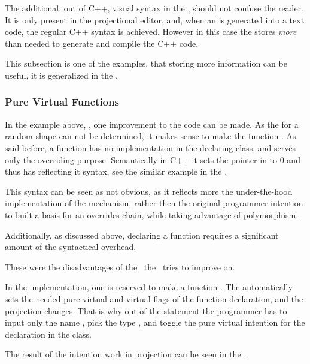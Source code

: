 
The additional, out of C++, visual syntax in the \pcpp, should not confuse the reader. It is only 
present in the projectional editor, and, when an  is generated into a text code, the regular
C++ syntax is achieved. However in this case the  stores \emph{more} than needed to 
generate and compile the C++ code. 

This subsection is one of the examples, that storing more information can be useful,
it is generalized in the .


\subsubsection{Pure Virtual Functions}
\label{purevirtualfuncs}

In the example above, , one improvement to the code can be made. As the  for a random shape can not 
be determined, it makes sense to make the  function . As said before, a  
function has no implementation in the declaring class, and serves only the overriding purpose. Semantically in C++ it sets the 
pointer in  to 0 and thus has reflecting it syntax, see the similar example in the .

This syntax can be seen as not obvious, as it reflects more the under-the-hood implementation of the mechanism,
rather then the original programmer intention to built a basis for an overrides chain, while taking advantage of 
polymorphism.

Additionally, as discussed above, declaring a  function requires a significant amount of the syntactical
overhead. 

These were the disadvantages of the \cpppl\ the \pcpp\ tries to improve on.

In the \pcpp implementation, one  is reserved to make a function . The  automatically
sets the needed pure virtual and virtual flags of the function declaration, and the projection changes. That is why out of the 
statement  the programmer has to input only the name , pick the type , and
toggle the pure virtual intention for the declaration in the  class.

The result of the intention work in projection can be seen in the .

